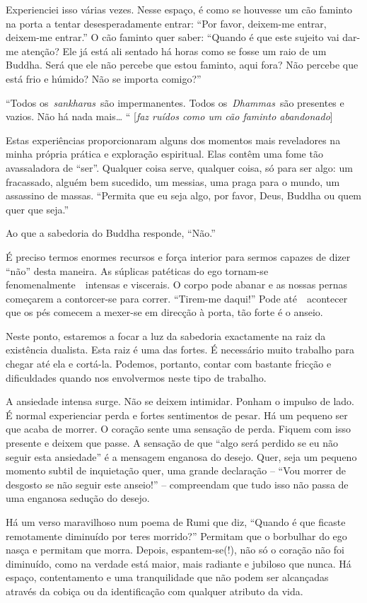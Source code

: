 Experienciei isso várias vezes. Nesse espaço, é como se houvesse um cão
faminto na porta a tentar desesperadamente entrar: ``Por favor,
deixem-me entrar, deixem-me entrar.'' O cão faminto quer saber: ``Quando
é que este sujeito vai dar-me atenção? Ele já está ali sentado há horas
como se fosse um raio de um Buddha. Será que ele não percebe que estou
faminto, aqui fora? Não percebe que está frio e húmido? Não se importa
comigo?''

``Todos os~\emph{sankharas}~são impermanentes. Todos
os~\emph{Dhammas}~são presentes e vazios. Não há nada mais\ldots{} ``
{[}\emph{faz ruídos como um cão faminto abandonado}{]}

Estas experiências proporcionaram alguns dos momentos mais reveladores
na minha própria prática e exploração espiritual. Elas contêm uma fome
tão avassaladora de ``ser''. Qualquer coisa serve, qualquer coisa, só
para ser algo: um fracassado, alguém bem sucedido, um messias, uma praga
para o mundo, um assassino de massas. ``Permita que eu seja algo, por
favor, Deus, Buddha ou quem quer que seja.''

Ao que a sabedoria do Buddha responde, ``Não.''

É preciso termos enormes recursos e força interior para sermos capazes
de dizer ``não'' desta maneira. As súplicas patéticas do ego tornam-se
fenomenalmente~~intensas e viscerais. O corpo pode abanar e as nossas
pernas começarem a contorcer-se para correr. ``Tirem-me daqui!'' Pode
até~~acontecer que os pés comecem a mexer-se em direcção à porta, tão
forte é o anseio.

Neste ponto, estaremos a focar a luz da sabedoria exactamente na raiz da
existência dualista. Esta raiz é uma das fortes. É necessário muito
trabalho para chegar até ela e cortá-la. Podemos, portanto, contar com
bastante fricção e dificuldades quando nos envolvermos neste tipo de
trabalho.

A ansiedade intensa surge. Não se deixem intimidar. Ponham o impulso de
lado. É normal experienciar perda e fortes sentimentos de pesar. Há um
pequeno ser que acaba de morrer. O coração sente uma sensação de perda.
Fiquem com isso presente e deixem que passe. A sensação de que ``algo
será perdido se eu não seguir esta ansiedade'' é a mensagem enganosa do
desejo. Quer, seja um pequeno momento subtil de inquietação quer, uma
grande declaração -- ``Vou morrer de desgosto se não seguir este
anseio!'' -- compreendam que tudo isso não passa de uma enganosa sedução
do desejo.

Há um verso maravilhoso num poema de Rumi que diz, ``Quando é que
ficaste remotamente diminuído por teres morrido?'' Permitam que o
borbulhar do ego nasça e permitam que morra. Depois, espantem-se(!), não
só o coração não foi diminuído, como na verdade está maior, mais
radiante e jubiloso que nunca. Há espaço, contentamento e uma
tranquilidade que não podem ser alcançadas através da cobiça ou da
identificação com qualquer atributo da vida.

